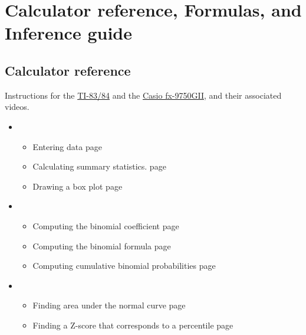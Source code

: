 \chapter{Calculator reference, Formulas, and Inference guide}

\newpage

\vspace{-55mm}

\section{Calculator reference}
\label{calculatorIndex}
Instructions for the \href{\oiRedirectUrl{ti_all}}{TI-83/84} and the \href{\oiRedirectUrl{casio_all}}{Casio fx-9750GII}, and their associated videos.

\begin{itemize}
\item[]   

\begin{itemize}\vspace{-1mm}
\setlength{\itemsep}{0mm}
\item[] Entering data \hfill page~\pageref{summarizedata}
\item[] Calculating summary statistics. \hfill page~\pageref{summstat}
\item[] Drawing a box plot \hfill page~\pageref{boxplot}
\end{itemize}

\item[]  
\begin{itemize}\vspace{-1mm}
\setlength{\itemsep}{0mm}
\item[] Computing the binomial coefficient \hfill page~\pageref{calculatorBinomial}
\item[] Computing the binomial formula \hfill page~\pageref{binomialformula}
\item[] Computing cumulative binomial probabilities \hfill page~\pageref{binomialcumulative}
\end{itemize}

\item[] 
\begin{itemize}\vspace{-1mm}
\setlength{\itemsep}{0mm}
\item[] Finding area under the normal curve  \hfill page~\pageref{normal}
\item[] Finding a Z-score that corresponds to a percentile  \hfill page~\pageref{invNorm}
\end{itemize}



\end{itemize}
